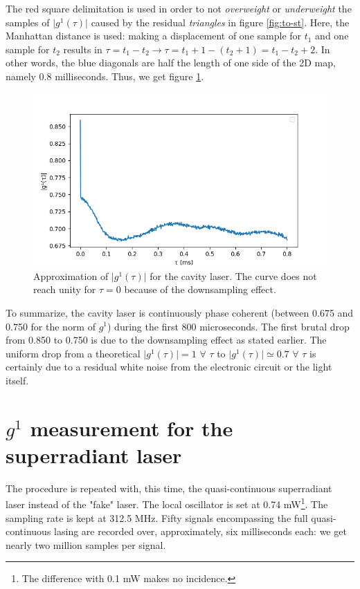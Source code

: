 \documentclass[11pt]{report}
\begin{document}
The red square delimitation is used in order to not \textit{overweight} or \textit{underweight} the samples of $\vert g^1(\tau) \vert$ caused by the residual \textit{triangles} in figure \ref{fig:to-st}. Here, the Manhattan distance is used: making a displacement of one sample for $t_1$ and one sample for $t_2$ results in $\tau = t_1 - t_2 \rightarrow \tau = t_1 + 1 - (t_2 + 1) = t_1 - t_2 + 2$. In other words, the blue diagonals are half the length of one side of the 2D map, namely 0.8 milliseconds. Thus, we get figure \ref{fig:st-stat}.
\begin{figure}[h!]
\centering
\includegraphics[width=0.7\linewidth]{st-stat}
\caption{Approximation of $\vert g^1(\tau) \vert$ for the cavity laser. The curve does not reach unity for $\tau=0$ because of the downsampling effect.}
\label{fig:st-stat}
\end{figure}

To summarize, the cavity laser is continuously phase coherent (between 0.675 and 0.750 for the norm of $g^1$) during the first 800 microseconds. The first brutal drop from 0.850 to 0.750 is due to the downsampling effect as stated earlier. The uniform drop from a theoretical $\vert g^1(\tau) \vert = 1 \,\, \forall \,\, \tau $ to $\vert g^1(\tau) \vert \simeq 0.7 \,\, \forall \,\, \tau $ is certainly due to a residual white noise from the electronic circuit or the light itself.

\section{$g^1$ measurement for the superradiant laser}

The procedure is repeated with, this time, the quasi-continuous superradiant laser instead of the "fake" laser. The local oscillator is set at 0.74 mW\footnote{The difference with 0.1 mW makes no incidence.}. The sampling rate is kept at 312.5 MHz. Fifty signals encompassing the full quasi-continuous lasing are recorded over, approximately, six milliseconds each: we get nearly two million samples per signal.
\end{document}
